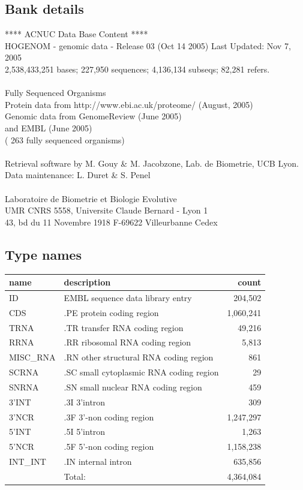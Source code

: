 \documentclass{article}
\begin{document}
\begin{Schunk}
\subsection{Bank details}
               ****     ACNUC Data Base Content      ****                      \\
  HOGENOM - genomic data - Release 03 (Oct 14 2005) Last Updated: Nov  7, 2005\\
2,538,433,251 bases; 227,950 sequences; 4,136,134 subseqs; 82,281 refers.\\
                                                                               \\
                        Fully Sequenced Organisms\\
   Protein data from http://www.ebi.ac.uk/proteome/ (August, 2005)\\
          Genomic data from GenomeReview  (June 2005) \\
                  and  EMBL (June 2005)\\
	   ( 263 fully sequenced organisms)\\
\\
Retrieval software by M. Gouy \& M. Jacobzone, Lab. de Biometrie, UCB Lyon.\\
Data maintenance: L. Duret \& S. Penel\\
\\
Laboratoire de Biometrie et Biologie Evolutive\\
UMR CNRS 5558, Universite Claude Bernard - Lyon 1 \\
43, bd du 11 Novembre 1918 F-69622 Villeurbanne Cedex\\


\subsection{Type names}
\noindent\begin{tabular}{llr}
\hline \hline
name & description & count \\
\hline
ID  &  EMBL sequence data library entry  &  204,502 \\
CDS  &  .PE protein coding region  &  1,060,241 \\
TRNA  &  .TR transfer RNA coding region  &  49,216 \\
RRNA  &  .RR ribosomal RNA coding region  &  5,813 \\
MISC\_RNA  &  .RN other structural RNA coding region  &  861 \\
SCRNA  &  .SC small cytoplasmic RNA coding region  &  29 \\
SNRNA  &  .SN small nuclear RNA coding region  &  459 \\
3'INT  &  .3I 3'intron  &  309 \\
3'NCR  &  .3F  3'-non coding region  &  1,247,297 \\
5'INT  &  .5I 5'intron  &  1,263 \\
5'NCR  &  .5F  5'-non coding region  &  1,158,238 \\
INT\_INT  &  .IN  internal intron  &  635,856 \\
\hline
 & Total: & 4,364,084 \\
\hline \hline
\end{tabular}


\end{Schunk}
\end{document}
